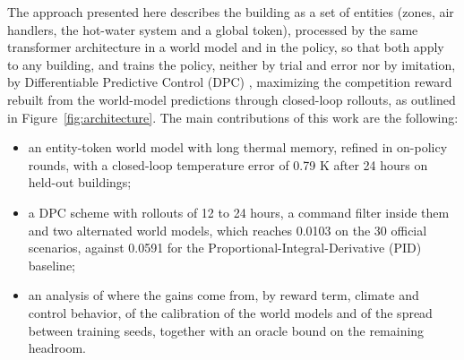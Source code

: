 \documentclass{article}
\begin{document}
The approach presented here describes the building as a set of entities (zones, air handlers, the hot-water system and a global token), processed by the same transformer architecture in a world model and in the policy, so that both apply to any building, and trains the policy, neither by trial and error nor by imitation, by Differentiable Predictive Control (DPC) \cite{drgona2022dpc}, maximizing the competition reward rebuilt from the world-model predictions through closed-loop rollouts, as outlined in Figure~\ref{fig:architecture}. The main contributions of this work are the following:
\begin{itemize}
  \item an entity-token world model with long thermal memory, refined in on-policy rounds, with a closed-loop temperature error of 0.79 K after 24 hours on held-out buildings;
  \item a DPC scheme with rollouts of 12 to 24 hours, a command filter inside them and two alternated world models, which reaches 0.0103 on the 30 official scenarios, against 0.0591 for the Proportional-Integral-Derivative (PID) baseline;
  \item an analysis of where the gains come from, by reward term, climate and control behavior, of the calibration of the world models and of the spread between training seeds, together with an oracle bound on the remaining headroom.
\end{itemize}
\end{document}
